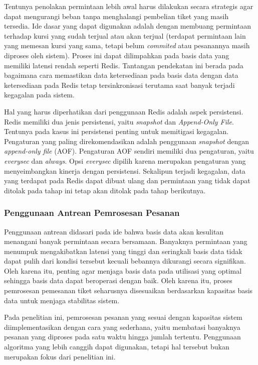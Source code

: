 Tentunya penolakan permintaan lebih awal harus dilakukan secara strategis agar dapat mengurangi beban tanpa menghalangi pembelian tiket yang masih tersedia. Ide dasar yang dapat digunakan adalah dengan membuang permintaan terhadap kursi yang sudah terjual atau akan terjual (terdapat permintaan lain yang memesan kursi yang sama, tetapi belum \textit{commited} atau pesanannya masih diproses oleh sistem). Proses ini dapat dilimpahkan pada basis data yang memiliki latensi rendah seperti Redis. Tantangan pendekatan ini berada pada bagaimana cara memastikan data ketersediaan pada basis data dengan data ketersediaan pada Redis tetap tersinkronisasi terutama saat banyak terjadi kegagalan pada sistem.

Hal yang harus diperhatikan dari penggunaan Redis adalah aspek persistensi. Redis memiliki dua jenis persistensi, yaitu \textit{snapshot} dan \textit{Append-Only File}. Tentunya pada kasus ini persistensi penting untuk memitigasi kegagalan. Pengaturan yang paling direkomendasikan adalah penggunaan \textit{snapshot} dengan \textit{append-only file} (AOF). Pengaturan AOF sendiri memiliki dua pengaturan, yaitu \textit{everysec} dan \textit{always}. Opsi \textit{everysec} dipilih karena merupakan pengaturan yang menyeimbangkan kinerja dengan persistensi. Sekalipun terjadi kegagalan, data yang terdapat pada Redis dapat dibuat ulang dan permintaan yang tidak dapat ditolak pada tahap ini tetap akan ditolak pada tahap berikutnya.

\subsubsection{Penggunaan Antrean Pemrosesan Pesanan}

Penggunaan antrean didasari pada ide bahwa basis data akan kesulitan menangani banyak permintaan secara bersamaan. Banyaknya permintaan yang menumpuk mengakibatkan latensi yang tinggi dan seringkali basis data tidak dapat pulih dari kondisi tersebut kecuali bebannya dikurangi secara signifikan. Oleh karena itu, penting agar menjaga basis data pada utilisasi yang optimal sehingga basis data dapat beroperasi dengan baik. Oleh karena itu, proses pemrosesan pemesanan tiket seharusnya disesuaikan berdasarkan kapasitas basis data untuk menjaga stabilitas sistem.

Pada penelitian ini, pemrosesan pesanan yang sesuai dengan kapasitas sistem diimplementasikan dengan cara yang sederhana, yaitu membatasi banyaknya pesanan yang diproses pada satu waktu hingga jumlah tertentu. Penggunaan algoritma yang lebih canggih dapat digunakan, tetapi hal tersebut bukan merupakan fokus dari penelitian ini.

